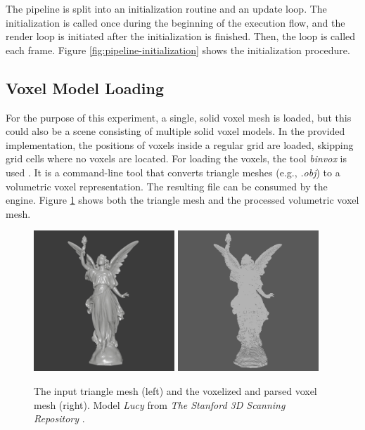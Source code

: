 \noindent
The pipeline is split into an initialization routine and an update loop. The initialization is called once during 
the beginning of the execution flow, and the render loop is initiated after the initialization is finished. Then, 
the loop is called each frame. Figure \ref{fig:pipeline-initialization} shows the initialization procedure. 

\subsection*{Voxel Model Loading} \label{subsec-voxel-model-loading}

For the purpose of this experiment, a single, solid voxel mesh is loaded, but this could also be a scene 
consisting of multiple solid voxel models. In the provided implementation, the positions of voxels inside a regular 
grid are loaded, skipping grid cells where no voxels are located. For loading the voxels, the tool \emph{binvox} 
is used \cite{binvox, Nooruddin2003}. It is a command-line tool that converts triangle meshes (e.g., \emph{.obj}) to 
a volumetric voxel representation. The resulting file can be consumed by the engine. Figure 
\ref{fig:trimesh-to-voxel-mesh} shows both the triangle mesh and the processed volumetric voxel mesh. 

\begin{figure}[h]
    \centering
    \includegraphics[width=200px]{images/graphics/lucy-triangle-mesh.jpg}
    \includegraphics[width=200px]{images/graphics/lucy-voxel-mesh.jpg}
    \caption{The input triangle mesh (left) and the voxelized and parsed voxel mesh (right). 
    Model \emph{Lucy} from \emph{The Stanford 3D Scanning Repository} \cite{Stanford23}.}
    \label{fig:trimesh-to-voxel-mesh}
\end{figure}


